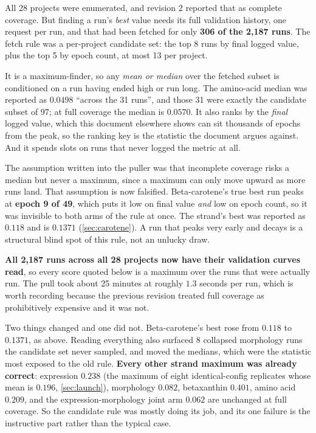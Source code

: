  All 28 projects were enumerated, and revision 2 reported that as complete
coverage. But finding a run's \emph{best} value needs its full validation history, one
request per run, and that had been fetched for only \textbf{306 of the 2,187 runs}. The
fetch rule was a per-project candidate set: the top 8 runs by final logged value, plus the
top 5 by epoch count, at most 13 per project.



 It is a
maximum-finder, so any \emph{mean or median} over the fetched subset is conditioned on a run
having ended high or run long. The amino-acid median was reported as $0.0498$ ``across the
31 runs'', and those 31 were exactly the candidate subset of 97; at full coverage the median
is $0.0570$. It also ranks by the \emph{final} logged value, which this document elsewhere
shows can sit thousands of epochs from the peak, so the ranking key is the statistic the
document argues against. And it spends slots on runs that never logged the metric at all.

The assumption written into the puller was that incomplete coverage risks a median but never
a maximum, since a maximum can only move upward as more runs land. That assumption is now
falsified. Beta-carotene's true best run peaks at \textbf{epoch 9 of 49}, which puts it low
on final value \emph{and} low on epoch count, so it was invisible to both arms of the rule at
once. The strand's best was reported as $0.118$ and is $0.1371$
(\cref{sec:carotene}). A run that peaks very early and decays is a structural blind spot of
this rule, not an unlucky draw.

 \textbf{All 2,187 runs across all 28 projects now
have their validation curves read}, so every score quoted below is a maximum over the runs
that were actually run. The pull took about 25 minutes at roughly $1.3$ seconds per run,
which is worth recording because the previous revision treated full coverage as
prohibitively expensive and it was not.

Two things changed and one did not. Beta-carotene's best rose from $0.118$ to $0.1371$, as
above. Reading everything also surfaced 8 collapsed morphology runs the candidate set never
sampled, and moved the medians, which were the statistic most exposed to the old rule.
\textbf{Every other strand maximum was already correct}: expression $0.238$ (the maximum of
eight identical-config replicates whose mean is $0.196$, \cref{sec:launch}), morphology
$0.082$, betaxanthin $0.401$, amino acid $0.209$, and the expression-morphology joint arm
$0.062$ are unchanged at full coverage. So the candidate rule was mostly doing its job, and
its one failure is the instructive part rather than the typical case.

